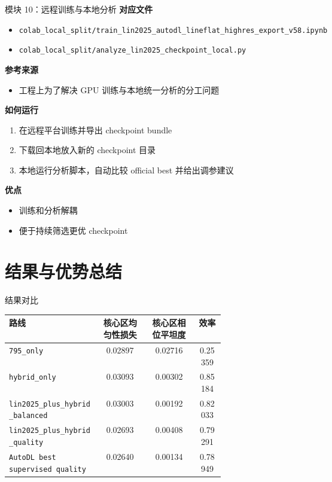 \documentclass[aspectratio=169,10pt]{ctexbeamer}
\begin{document}
\begin{frame}{模块 10：远程训练与本地分析}
  \textbf{对应文件}
  \begin{itemize}
    \item \texttt{colab\_local\_split/train\_lin2025\_autodl\_lineflat\_highres\_export\_v58.ipynb}
    \item \texttt{colab\_local\_split/analyze\_lin2025\_checkpoint\_local.py}
  \end{itemize}

  \textbf{参考来源}
  \begin{itemize}
    \item 工程上为了解决 GPU 训练与本地统一分析的分工问题
  \end{itemize}

  \textbf{如何运行}
  \begin{enumerate}
    \item 在远程平台训练并导出 checkpoint bundle
    \item 下载回本地放入新的 checkpoint 目录
    \item 本地运行分析脚本，自动比较 official best 并给出调参建议
  \end{enumerate}

  \textbf{优点}
  \begin{itemize}
    \item 训练和分析解耦
    \item 便于持续筛选更优 checkpoint
  \end{itemize}
\end{frame}

\section{结果与优势总结}

\begin{frame}{结果对比}
  \centering
  \small
  \begin{tabular}{>{\raggedright\arraybackslash}p{0.42\linewidth}ccc}
    \toprule
    路线 & 核心区均匀性损失 & 核心区相位平坦度 & 效率 \\
    \midrule
    \texttt{795\_only} & 0.02897 & 0.02716 & 0.25359 \\
    \texttt{hybrid\_only} & 0.03093 & 0.00302 & 0.85184 \\
    \texttt{lin2025\_plus\_hybrid\_balanced} & 0.03003 & 0.00192 & 0.82033 \\
    \texttt{lin2025\_plus\_hybrid\_quality} & 0.02693 & 0.00408 & 0.79291 \\
    \texttt{AutoDL best supervised quality} & 0.02640 & 0.00134 & 0.78949 \\
    \bottomrule
  \end{tabular}
\end{frame}
\end{document}
